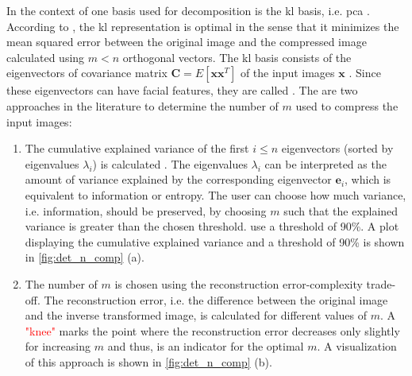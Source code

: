 In the context of \eigenfaces{} one basis used for decomposition is the \ac{kl} basis, i.e. \ac{pca} \cite{eigenfaces1997, eigenfaces1991}.
According to \citeauthor{eigenfaces1997}, the \ac{kl} representation is optimal in the sense that it minimizes the mean squared error between the original image and 
the compressed image calculated using $m < n$ orthogonal vectors.
The \ac{kl} basis consists of the eigenvectors of covariance matrix $\textbf{C} = E\left[ \textbf{x}\textbf{x}^{T} \right]$ of the input images $\mathbf{x}$ \cite{eigenfaces1997}.
Since these eigenvectors can have facial features, they are called \textit{\eigenfaces{}}.
The are two approaches in the literature to determine the number of \eigenfaces{} $m$ used to compress the input images:
\begin{enumerate}[label=(\alph*)]
    \item The cumulative explained variance of the first $i \le n$ eigenvectors (sorted by eigenvalues $\lambda_i$) is calculated 
        \cite{eigenfaces1997, face-recognition2020, face-recognition2021}.
        The eigenvalues $\lambda_i$ can be interpreted as the amount of variance explained by the corresponding eigenvector $\textbf{e}_i$, which is equivalent to information or entropy.
        The user can choose how much variance, i.e. information, should be preserved, by choosing $m$ such that the explained variance is greater than the chosen threshold.
        \citeauthor{face-recognition2021} use a threshold of 90\%.
        A plot displaying the cumulative explained variance and a threshold of 90\% is shown in \autoref{fig:det_n_comp} (a).

    \item The number of \eigenfaces{} $m$ is chosen using the reconstruction error-complexity trade-off. %
        The reconstruction error, i.e. the difference between the original image and the inverse transformed image, is calculated for different values of $m$.
        A \textcolor{red}{"knee"} marks the point where the reconstruction error decreases only slightly for increasing $m$ and thus, is an indicator for the optimal $m$.
        A visualization of this approach is shown in \autoref{fig:det_n_comp} (b).
\end{enumerate}
 

